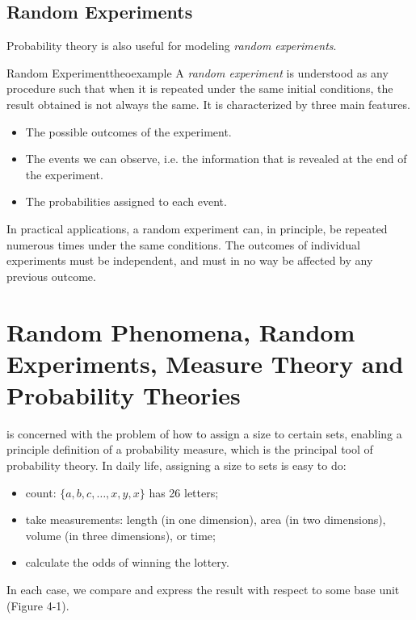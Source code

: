 \documentclass{tufte-handout}
\begin{document}
\subsection{Random Experiments}

Probability theory is also useful for modeling  \textit{random experiments}.

\begin{mydef}{Random Experiment}{theoexample}
A \textit{random experiment} is understood as any procedure such that when it is repeated under the same initial conditions, the result obtained is not always the same. It is characterized by three main features.
\begin{itemize}
\item The possible outcomes of the experiment.
\item The events we can observe, i.e. the information that is revealed at the end of the experiment.
\item The probabilities assigned to each event.
\end{itemize}
\end{mydef}

In practical applications, a random experiment can, in principle, be repeated numerous times under the same
conditions. The outcomes of individual experiments must be independent, and must in no
way be affected by any previous outcome.


\section{Random Phenomena, Random Experiments, Measure Theory and  Probability Theories}



 is concerned with the problem of how to assign a size to certain sets, enabling a principle definition of a probability measure, which is the principal tool of probability theory.
In daily life, assigning a size  to sets is easy to do:
\begin{itemize}
\item count: $\{a,b,c,\dots,x,y,x\}$ has 26 letters;
\item take measurements: length (in one dimension), area (in two dimensions), volume (in three dimensions), or time;
\item calculate the odds of winning the lottery.
\end{itemize}
In each case, we compare and express the result with respect to some base unit (Figure 4-1).
\end{document}
